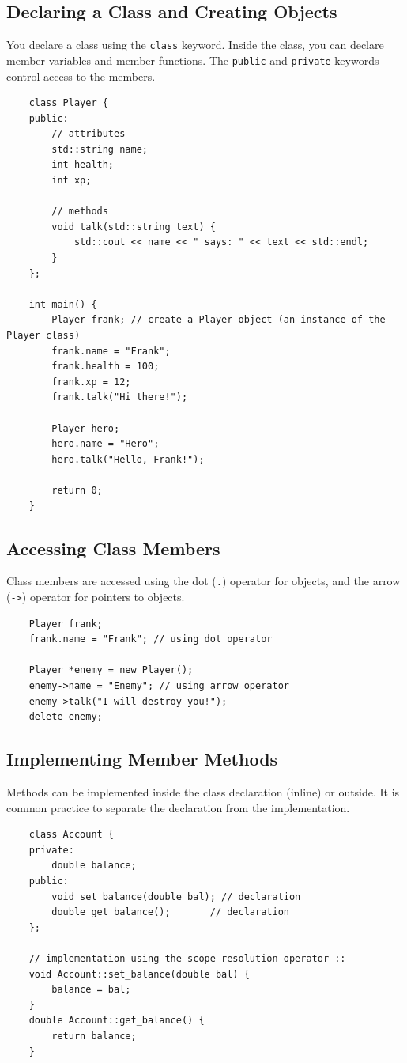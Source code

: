 \subsection{Declaring a Class and Creating Objects}
You declare a class using the \texttt{class} keyword. Inside the class, you can declare member variables and member functions. The \texttt{public} and \texttt{private} keywords control access to the members.
\begin{lstlisting}
	class Player {
	public:
		// attributes
		std::string name;
		int health;
		int xp;

		// methods
		void talk(std::string text) {
			std::cout << name << " says: " << text << std::endl;
		}
	};

	int main() {
		Player frank; // create a Player object (an instance of the Player class)
		frank.name = "Frank";
		frank.health = 100;
		frank.xp = 12;
		frank.talk("Hi there!");

		Player hero;
		hero.name = "Hero";
		hero.talk("Hello, Frank!");

		return 0;
	}
\end{lstlisting}

\subsection{Accessing Class Members}
Class members are accessed using the dot (\texttt{.}) operator for objects, and the arrow (\texttt{->}) operator for pointers to objects.
\begin{lstlisting}
	Player frank;
	frank.name = "Frank"; // using dot operator

	Player *enemy = new Player();
	enemy->name = "Enemy"; // using arrow operator
	enemy->talk("I will destroy you!");
	delete enemy;
\end{lstlisting}

\subsection{Implementing Member Methods}
Methods can be implemented inside the class declaration (inline) or outside. It is common practice to separate the declaration from the implementation.
\begin{lstlisting}
	class Account {
	private:
		double balance;
	public:
		void set_balance(double bal); // declaration
		double get_balance();       // declaration
	};

	// implementation using the scope resolution operator ::
	void Account::set_balance(double bal) {
		balance = bal;
	}
	double Account::get_balance() {
		return balance;
	}
\end{lstlisting}


